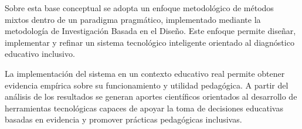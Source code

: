 \begin{refsection}
Sobre esta base conceptual se adopta un enfoque metodológico de métodos mixtos dentro de un paradigma pragmático, implementado mediante la metodología de Investigación Basada en el Diseño. Este enfoque permite diseñar, implementar y refinar un sistema tecnológico inteligente orientado al diagnóstico educativo inclusivo.

La implementación del sistema en un contexto educativo real permite obtener evidencia empírica sobre su funcionamiento y utilidad pedagógica. A partir del análisis de los resultados se generan aportes científicos orientados al desarrollo de herramientas tecnológicas capaces de apoyar la toma de decisiones educativas basadas en evidencia y promover prácticas pedagógicas inclusivas.

\printbibliography[heading=subbibliography,title={Referencias (Capítulo III)}]

\end{refsection}